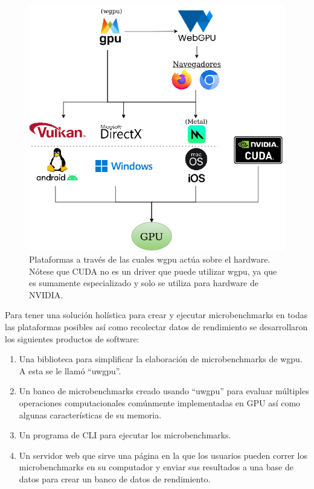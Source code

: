 \documentclass[conference]{IEEEtran}
\begin{document}
\begin{figure}
  \includegraphics[width=1.05\linewidth]{images/Diagrama Plataformas.png}
  \caption{Plataformas a través de las cuales wgpu actúa sobre el hardware.
  Nótese que CUDA no es un driver que puede utilizar wgpu, ya que es sumamente
  especializado y solo se utiliza para hardware de NVIDIA.}
  \label{fig:wgpu_plataformas}
\end{figure}

Para tener una solución holística para crear y ejecutar microbenchmarks en todas las plataformas posibles así como recolectar datos de rendimiento se desarrollaron los siguientes productos de software:

\begin{enumerate}
  \item Una biblioteca para simplificar la elaboración de microbenchmarks de wgpu. A esta se le llamó “uwgpu”.
  \item Un banco de microbenchmarks creado usando “uwgpu” para evaluar
    múltiples operaciones computacionales comúnmente implementadas en GPU así
    como algunas características de su memoria.
  \item Un programa de CLI para ejecutar los microbenchmarks.
  \item Un servidor web que sirve una página en la que los usuarios pueden
    correr los microbenchmarks en su computador y enviar sus resultados a una
    base de datos para crear un banco de datos de rendimiento.
\end{enumerate}
\end{document}
